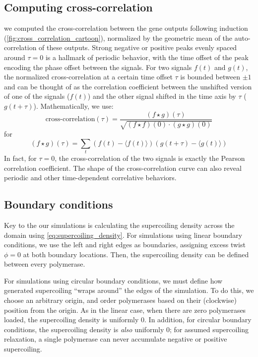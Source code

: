 \documentclass[11pt]{article}
\begin{document}
\subsection{Computing cross-correlation} \label{sec:supp:cross_correlation}
we computed the cross-correlation between the gene outputs following induction (\cref{fig:cross_correlation_cartoon}), normalized by the geometric mean of the auto-correlation of these outputs.  Strong negative or positive peaks evenly spaced around \(\tau = 0\) is a hallmark of periodic behavior, with the time offset of the peak encoding the phase offset between the signals. For two signals \(f(t)\) and \(g(t)\), the normalized cross-correlation at a certain time offset \(\tau\) is bounded between \(\pm1\) and can be thought of as the correlation coefficient between the unshifted version of one of the signals (\(f(t)\)) and the other signal shifted in the time axis by \(\tau\) (\(g(t + \tau)\)). Mathematically, we use:
\begin{equation}
\text{cross-correlation}(\tau) = \frac{(f \star g)(\tau)}{\sqrt{(f \star f)(0) \cdot (g \star g)(0)}}
\end{equation}
for
\begin{equation}
    (f \star g)(\tau) = \sum_t (f(t) - \langle f(t)\rangle)(g(t+\tau) - \langle g(t)\rangle)
\end{equation}
In fact, for \(\tau = 0\), the cross-correlation of the two signals is exactly the Pearson correlation coefficient. The shape of the cross-correlation curve can also reveal periodic and other time-dependent correlative behaviors.

\subsection{Boundary conditions} \label{sec:appendix:bcs}

Key to the our simulations is calculating the supercoiling density across the domain using \cref{eq:supercoiling_density}.
For simulations using linear boundary conditions, we use the left and right edges as boundaries, assigning excess twist \(\phi = 0\) at both boundary locations. Then, the supercoiling density can be defined between every polymerase.

For simulations using circular boundary conditions, we must define how generated supercoiling ``wraps around'' the edges of the simulation. To do this, we choose an arbitrary origin, and order polymerases based on their (clockwise) position from the origin. As in the linear case, when there are zero polymerases loaded, the supercoiling density is uniformly 0. In addition, for circular boundary conditions, the supercoiling density is \emph{also} uniformly 0; for assumed supercoiling relaxation, a single polymerase can never accumulate negative or positive supercoiling.
\end{document}
